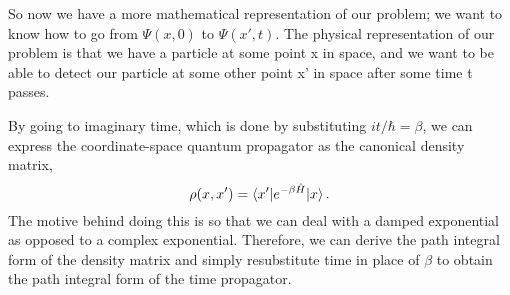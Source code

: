 \documentclass{article}
\newcommand{\be}{\begin{equation}}
\newcommand{\ee}{\end{equation}}
\begin{document}
So now we have a more mathematical representation of our problem; we want to know how to go from $\Psi(x,0)$ to $\Psi(x',t)$.
The physical representation of our problem is that we have a particle at some point x in space, and we want to be able to detect our particle at some other point x' in space after some time t passes.

By going to imaginary time, which is done by substituting $it/\hbar = \beta$, we can express the coordinate-space quantum propagator as the canonical density matrix,
\be \label{eq:density_mat}
  \rho(x,x') = \braket{x'|e^{-\beta \hat{H}}| x} .
\ee
The motive behind doing this is so that we can deal with a damped exponential as opposed to a complex exponential.\cite{tuckerman}
Therefore, we can derive the path integral form of the density matrix and simply resubstitute time in place of $\beta$ to obtain the path integral form of the time propagator.
\end{document}
